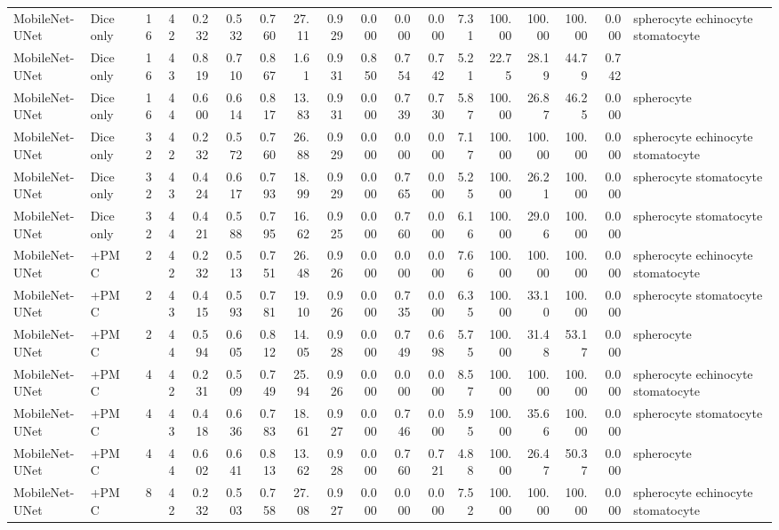 \documentclass[10pt]{article}
\begin{document}
\begin{landscape}
{\begin{longtable}{l l r r r r r r r r r r r r r r r l}
MobileNet-UNet & Dice only & 16 & 42 & 0.232 & 0.532 & 0.760 & 27.11 & 0.929 & 0.000 & 0.000 & 0.000 & 7.31 & 100.00 & 100.00 & 100.00 & 0.000 & spherocyte echinocyte stomatocyte \\
MobileNet-UNet & Dice only & 16 & 43 & 0.819 & 0.710 & 0.867 & 1.61 & 0.931 & 0.850 & 0.754 & 0.742 & 5.21 & 22.75 & 28.19 & 44.79 & 0.742 &  \\
MobileNet-UNet & Dice only & 16 & 44 & 0.600 & 0.614 & 0.817 & 13.83 & 0.931 & 0.000 & 0.739 & 0.730 & 5.87 & 100.00 & 26.87 & 46.25 & 0.000 & spherocyte \\
MobileNet-UNet & Dice only & 32 & 42 & 0.232 & 0.572 & 0.760 & 26.88 & 0.929 & 0.000 & 0.000 & 0.000 & 7.17 & 100.00 & 100.00 & 100.00 & 0.000 & spherocyte echinocyte stomatocyte \\
MobileNet-UNet & Dice only & 32 & 43 & 0.424 & 0.617 & 0.793 & 18.99 & 0.929 & 0.000 & 0.765 & 0.000 & 5.25 & 100.00 & 26.21 & 100.00 & 0.000 & spherocyte stomatocyte \\
MobileNet-UNet & Dice only & 32 & 44 & 0.421 & 0.588 & 0.795 & 16.62 & 0.925 & 0.000 & 0.760 & 0.000 & 6.16 & 100.00 & 29.06 & 100.00 & 0.000 & spherocyte stomatocyte \\
MobileNet-UNet & +PMC & 2 & 42 & 0.232 & 0.513 & 0.751 & 26.48 & 0.926 & 0.000 & 0.000 & 0.000 & 7.66 & 100.00 & 100.00 & 100.00 & 0.000 & spherocyte echinocyte stomatocyte \\
MobileNet-UNet & +PMC & 2 & 43 & 0.415 & 0.593 & 0.781 & 19.10 & 0.926 & 0.000 & 0.735 & 0.000 & 6.35 & 100.00 & 33.10 & 100.00 & 0.000 & spherocyte stomatocyte \\
MobileNet-UNet & +PMC & 2 & 44 & 0.594 & 0.605 & 0.812 & 14.05 & 0.928 & 0.000 & 0.749 & 0.698 & 5.75 & 100.00 & 31.48 & 53.17 & 0.000 & spherocyte \\
MobileNet-UNet & +PMC & 4 & 42 & 0.231 & 0.509 & 0.749 & 25.94 & 0.926 & 0.000 & 0.000 & 0.000 & 8.57 & 100.00 & 100.00 & 100.00 & 0.000 & spherocyte echinocyte stomatocyte \\
MobileNet-UNet & +PMC & 4 & 43 & 0.418 & 0.636 & 0.783 & 18.61 & 0.927 & 0.000 & 0.746 & 0.000 & 5.95 & 100.00 & 35.66 & 100.00 & 0.000 & spherocyte stomatocyte \\
MobileNet-UNet & +PMC & 4 & 44 & 0.602 & 0.641 & 0.813 & 13.62 & 0.928 & 0.000 & 0.760 & 0.721 & 4.88 & 100.00 & 26.47 & 50.37 & 0.000 & spherocyte \\
MobileNet-UNet & +PMC & 8 & 42 & 0.232 & 0.503 & 0.758 & 27.08 & 0.927 & 0.000 & 0.000 & 0.000 & 7.52 & 100.00 & 100.00 & 100.00 & 0.000 & spherocyte echinocyte stomatocyte \\

\end{longtable}}
\end{landscape}
\end{document}
